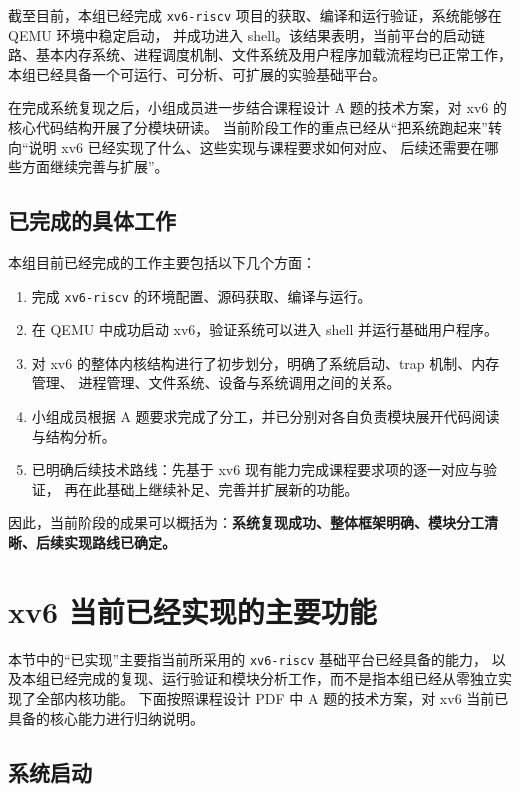 \documentclass[12pt,a4paper]{ctexart}
\begin{document}
截至目前，本组已经完成 \texttt{xv6-riscv} 项目的获取、编译和运行验证，系统能够在 QEMU 环境中稳定启动，
并成功进入 shell。该结果表明，当前平台的启动链路、基本内存系统、进程调度机制、文件系统及用户程序加载流程均已正常工作，
本组已经具备一个可运行、可分析、可扩展的实验基础平台。

在完成系统复现之后，小组成员进一步结合课程设计 A 题的技术方案，对 xv6 的核心代码结构开展了分模块研读。
当前阶段工作的重点已经从“把系统跑起来”转向“说明 xv6 已经实现了什么、这些实现与课程要求如何对应、
后续还需要在哪些方面继续完善与扩展”。

\subsection{已完成的具体工作}

本组目前已经完成的工作主要包括以下几个方面：

\begin{enumerate}
  \item 完成 \texttt{xv6-riscv} 的环境配置、源码获取、编译与运行。
  \item 在 QEMU 中成功启动 xv6，验证系统可以进入 shell 并运行基础用户程序。
  \item 对 xv6 的整体内核结构进行了初步划分，明确了系统启动、trap 机制、内存管理、
        进程管理、文件系统、设备与系统调用之间的关系。
  \item 小组成员根据 A 题要求完成了分工，并已分别对各自负责模块展开代码阅读与结构分析。
  \item 已明确后续技术路线：先基于 xv6 现有能力完成课程要求项的逐一对应与验证，
        再在此基础上继续补足、完善并扩展新的功能。
\end{enumerate}

因此，当前阶段的成果可以概括为：\textbf{系统复现成功、整体框架明确、模块分工清晰、后续实现路线已确定。}

\section{xv6 当前已经实现的主要功能}

本节中的“已实现”主要指当前所采用的 \texttt{xv6-riscv} 基础平台已经具备的能力，
以及本组已经完成的复现、运行验证和模块分析工作，而不是指本组已经从零独立实现了全部内核功能。
下面按照课程设计 PDF 中 A 题的技术方案，对 xv6 当前已具备的核心能力进行归纳说明。

\subsection{系统启动}
\end{document}
